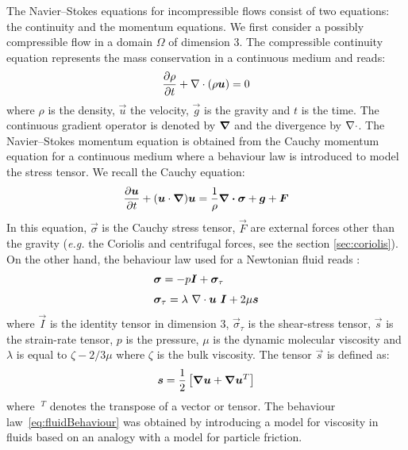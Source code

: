 The Navier--Stokes equations for incompressible flows consist of two equations: the continuity and the momentum equations.
We first consider a possibly compressible flow in a domain $\Omega$ of dimension 3.
The compressible continuity equation represents the mass conservation in a continuous medium and reads:
\begin{equation}\label{eq:ContinuityRef}
  \dfrac{\partial \rho}{\partial t} + \nabla \cdot (\rho \bm{u}) = 0
\end{equation}
where $\rho$ is the density, $\vec{u}$ the velocity, $\vec{g}$ is the gravity and $t$ is the time.
The continuous gradient operator is denoted by $\bm{\nabla}$ and the divergence by $\nabla \cdot$.
The Navier--Stokes momentum equation is obtained from the Cauchy momentum equation for a continuous medium where a behaviour
law is introduced to model the stress tensor.
We recall the Cauchy equation:
\begin{equation}\label{eq:MomentumRef}
  \dfrac{\partial \bm{u}}{\partial t} + (\bm{u} \cdot \bm{\nabla}) \bm{u} = \dfrac{1}{\rho}\bm{\nabla \cdot}\bm{\sigma} + \bm{g} + \bm{F}
\end{equation}
In this equation, $\vec{\sigma}$ is the Cauchy stress tensor, $\vec{F}$ are external forces other than the gravity (\textit{e.g.} the Coriolis and centrifugal forces, see the section \ref{sec:coriolis}).
On the other hand, the behaviour law used for a Newtonian fluid reads%
:
\begin{equation}\label{eq:fluidBehaviour}
  \begin{array}{l}
    \vec{\sigma} = -p \vec{I} + \vec{\sigma}_\tau \medskip \\
    \vec{\sigma}_\tau = \lambda~ \Div \vec{u}~ \vec{I} + 2\mu\vec{s}
  \end{array}
\end{equation}
where $\vec{I}$ is the identity tensor in dimension 3, $\vec{\sigma}_\tau$ is the shear-stress tensor, $\vec{s}$ is the strain-rate tensor,
$p$ is the pressure, $\mu$ is the dynamic molecular viscosity
and $\lambda$ is equal to $\zeta-2/3\mu$ where $\zeta$ is the bulk viscosity.
The tensor $\vec{s}$ is defined as:
\begin{equation}\label{eq:strain-rate}
  \bm{s} = \dfrac{1}{2}\left[\bm{\nabla}\bm{u} + \bm{\nabla}\bm{u}^T\right]
\end{equation}
where $~^T$ denotes the transpose of a vector or tensor.
The behaviour law~\eqref{eq:fluidBehaviour} was obtained by introducing a model for viscosity in fluids based on an analogy with a model for particle friction.

